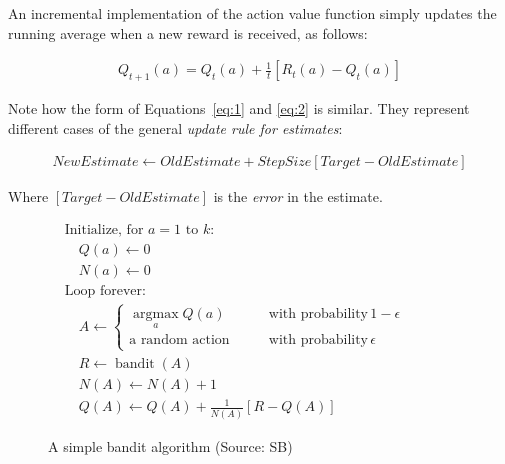 An incremental implementation of the action value function simply updates the running average when a new reward is received, as follows:

\begin{align}
Q_{t+1}(a) = Q_t(a) + \frac{1}{t}\left[R_t(a) - Q_t(a)\right] \label{eq:2}
\end{align}

Note how the form of Equations~\ref{eq:1} and \ref{eq:2} is similar. They represent different cases of the general \emph{update rule for estimates}:

\begin{align*}
NewEstimate \leftarrow OldEstimate + StepSize \left[ Target - OldEstimate \right]
\end{align*}

Where $\left[ Target - OldEstimate \right]$ is the \emph{error} in the estimate.

\begin{figure}
\begin{pseudocodebox}
\begin{align*}
&\text{Initialize, for $a=1$ to $k$:}\\
&\quad Q(a) \leftarrow 0 \\
&\quad N(a) \leftarrow 0 \\
&\text{Loop forever:} \\
&\quad A \leftarrow \begin{cases} \operatorname*{arg max}_a Q(a) &\qquad \text{with probability}\, 1-\epsilon \\
\text{a random action} &\qquad \text{with probability} 
\, \epsilon
\end{cases} \hspace{1in} \\
&\quad R \leftarrow \operatorname{bandit}(A) \\
&\quad N(A) \leftarrow N(A) + 1 \\
&\quad Q(A) \leftarrow Q(A) + \frac{1}{N(A)} \left[ R - Q(A) \right]
\end{align*}
\end{pseudocodebox}
\caption{A simple bandit algorithm (Source: SB)}
\label{fig:karmedbandit}
\end{figure}

